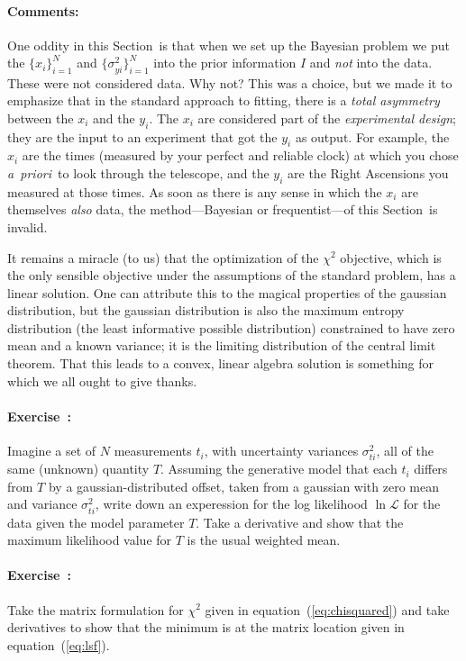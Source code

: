 \documentclass[12pt]{article}
\newcommand{\notenglish}[1]{\textit{#1}}
\newcommand{\apriori}{\notenglish{a~priori}}
\newcommand{\sectionname}{Section}
\newcommand{\equationname}{equation}
\newcommand{\problemname}{Exercise}
\newcommand{\commentsname}{Comments}
\newcounter{problem}
\newenvironment{problem}{\paragraph{\problemname~\theproblem:}\refstepcounter{problem}}{}
\newenvironment{comments}{\paragraph{\commentsname:}}{}
\newcommand{\setofall}[3]{\{{#1}\}_{{#2}}^{{#3}}}
\newcommand{\allx}{\setofall{x_i}{i=1}{N}}
\newcommand{\allsigmay}{\setofall{\sigma_{yi}^2}{i=1}{N}}
\newcommand{\like}{\mathscr{L}}
\begin{document}
\begin{comments}
One oddity in this \sectionname\ is that when we set up the Bayesian
problem we put the $\allx$ and $\allsigmay$ into the prior information
$I$ and \emph{not} into the data.  These were not considered data.
Why not?  This was a choice, but we made it to emphasize that in the
standard approach to fitting, there is a \emph{total asymmetry}
between the $x_i$ and the $y_i$.  The $x_i$ are considered part of the
\emph{experimental design}; they are the input to an experiment that
got the $y_i$ as output.  For example, the $x_i$ are the times
(measured by your perfect and reliable clock) at which you chose
\apriori\ to look through the telescope, and the $y_i$ are the Right
Ascensions you measured at those times.  As soon as there is any sense
in which the $x_i$ are themselves \emph{also} data, the
method---Bayesian or frequentist---of this \sectionname\ is invalid.

It remains a miracle (to us) that the optimization of the $\chi^2$
objective, which is the only sensible objective under the assumptions
of the standard problem, has a linear solution.  One can attribute
this to the magical properties of the gaussian distribution, but the
gaussian distribution is also the maximum entropy distribution (the
least informative possible distribution) constrained to have zero mean
and a known variance; it is the limiting distribution of the central
limit theorem.  That this leads to a convex, linear algebra solution
is something for which we all ought to give thanks.
\end{comments}

\begin{problem}
Imagine a set of $N$ measurements $t_i$, with uncertainty variances
$\sigma_{ti}^2$, all of the same (unknown) quantity $T$.  Assuming the
generative model that each $t_i$ differs from $T$ by a
gaussian-distributed offset, taken from a gaussian with zero mean and
variance $\sigma_{ti}^2$, write down an experession for the log
likelihood $\ln\like$ for the data given the model parameter $T$.
Take a derivative and show that the maximum likelihood value for $T$
is the usual weighted mean.
\end{problem}

\begin{problem}
Take the matrix formulation for $\chi^2$ given in
\equationname~(\ref{eq:chisquared}) and take derivatives to show that
the minimum is at the matrix location given in
\equationname~(\ref{eq:lsf}).
\end{problem}
\end{document}
